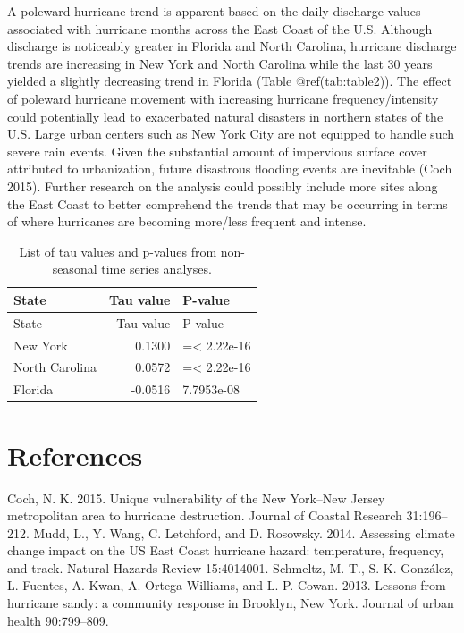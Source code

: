 \documentclass[
  12pt,
]{article}
\begin{document}
A poleward hurricane trend is apparent based on the daily discharge
values associated with hurricane months across the East Coast of the
U.S. Although discharge is noticeably greater in Florida and North
Carolina, hurricane discharge trends are increasing in New York and
North Carolina while the last 30 years yielded a slightly decreasing
trend in Florida (Table @ref(tab:table2)). The effect of poleward
hurricane movement with increasing hurricane frequency/intensity could
potentially lead to exacerbated natural disasters in northern states of
the U.S. Large urban centers such as New York City are not equipped to
handle such severe rain events. Given the substantial amount of
impervious surface cover attributed to urbanization, future disastrous
flooding events are inevitable (Coch 2015). Further research on the
analysis could possibly include more sites along the East Coast to
better comprehend the trends that may be occurring in terms of where
hurricanes are becoming more/less frequent and intense.

\begin{longtable}[]{@{}lrl@{}}
\caption{List of tau values and p-values from non-seasonal time series
analyses.}\tabularnewline
\toprule
State & Tau value & P-value \\
\midrule
\endfirsthead
\toprule
State & Tau value & P-value \\
\midrule
\endhead
New York & 0.1300 & =\textless{} 2.22e-16 \\
North Carolina & 0.0572 & =\textless{} 2.22e-16 \\
Florida & -0.0516 & 7.7953e-08 \\
\bottomrule
\end{longtable}

\newpage

\hypertarget{references}{%
\section{References}\label{references}}

Coch, N. K. 2015. Unique vulnerability of the New York--New Jersey
metropolitan area to hurricane destruction. Journal of Coastal Research
31:196--212. Mudd, L., Y. Wang, C. Letchford, and D. Rosowsky. 2014.
Assessing climate change impact on the US East Coast hurricane hazard:
temperature, frequency, and track. Natural Hazards Review 15:4014001.
Schmeltz, M. T., S. K. González, L. Fuentes, A. Kwan, A.
Ortega-Williams, and L. P. Cowan. 2013. Lessons from hurricane sandy: a
community response in Brooklyn, New York. Journal of urban health
90:799--809.
\end{document}
